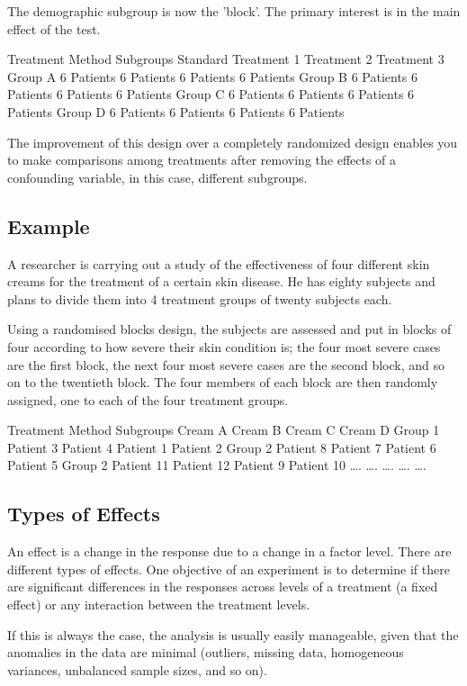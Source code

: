 \documentclass[a4paper,12pt]{article}
\begin{document}
The demographic subgroup is now the 'block'. The primary interest is in the main effect of the test.

	Treatment Method
Subgroups	Standard	Treatment 1	Treatment 2	Treatment 3
Group A	6 Patients	6 Patients	6 Patients	6 Patients
Group B	6 Patients	6 Patients	6 Patients	6 Patients
Group C	6 Patients	6 Patients	6 Patients	6 Patients
Group D	6 Patients	6 Patients	6 Patients	6 Patients

The improvement of this design over a completely randomized design enables you to make comparisons among treatments after removing the effects of a confounding variable, in this case, different subgroups.

\subsection{Example} 
A researcher is carrying out a study of the effectiveness of four different skin creams for the treatment of a certain skin disease. He has eighty subjects and plans to divide them into 4 treatment groups of twenty subjects each. 

Using a randomised blocks design, the subjects are assessed and put in blocks of four according to how severe their skin condition is; the four most severe cases are the first block, the next four most severe cases are the second block, and so on to the twentieth block. The four members of each block are then randomly assigned, one to each of the four treatment groups.

	Treatment Method
Subgroups	Cream A	Cream B	Cream C	Cream D
Group 1	Patient 3	Patient 4	Patient 1	Patient 2
Group 2	 Patient 8	Patient 7	Patient 6	Patient 5
Group 2	Patient 11	Patient 12	 Patient 9	Patient 10
….	….	….	….	….

\subsection{Types of Effects}
An effect is a change in the response due to a change in a factor level. There are different types of effects. One objective of an experiment is to determine if there are significant differences in the responses across levels of a treatment (a fixed effect) or any interaction between the treatment levels. 

If this is always the case, the analysis is usually easily manageable, given that the anomalies in the data are minimal (outliers, missing data, homogeneous variances, unbalanced sample sizes, and so on).
\end{document}
